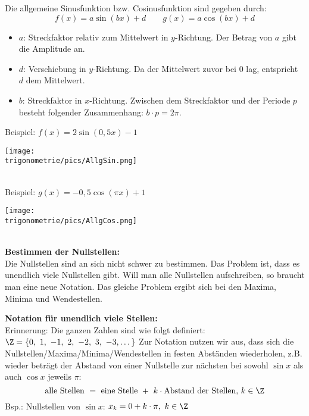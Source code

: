 Die allgemeine Sinusfunktion bzw. Cosinusfunktion sind gegeben durch:
\[f(x)=a\sin\left(bx\right)+d\qquad g(x)=a\cos\left(bx\right)+d\]
\begin{itemize}
	\item \(a\): \textcolor{loes}{Streckfaktor relativ zum Mittelwert in \(y\)-Richtung. Der Betrag von \(a\) gibt die Amplitude an.}\\
	\item \(d\): \textcolor{loes}{Verschiebung in \(y\)-Richtung. Da der Mittelwert zuvor bei \(0\) lag, entspricht \(d\) dem Mittelwert.}\\
	\item \(b\): \textcolor{loes}{Streckfaktor in \(x\)-Richtung. Zwischen dem Streckfaktor und der Periode \(p\) besteht folgender Zusammenhang: \(b\cdot p=2\pi\).}\\
\end{itemize}
Beispiel: \(\displaystyle f(x)=2\sin\left(0,5x\right)-1\)\\
\begin{minipage}{\textwidth}
	\texttt{[image: \\trigonometrie/pics/AllgSin.png]}\\
\end{minipage}\\
Beispiel: \(\displaystyle g(x)=-0,5\cos\left(\pi x\right)+1\)\\
\begin{minipage}{\textwidth}
	\texttt{[image: \\trigonometrie/pics/AllgCos.png]}\\
\end{minipage}\\
\newpage
\textbf{Bestimmen der Nullstellen:}\\
Die Nullstellen sind an sich nicht schwer zu bestimmen. Das Problem ist, dass es unendlich viele Nullstellen gibt. Will man alle Nullstellen aufschreiben, so braucht man eine neue Notation. Das gleiche Problem ergibt sich bei den Maxima, Minima und Wendestellen.
\begin{tcolorbox}
	\textbf{Notation für unendlich viele Stellen:}\\
	Erinnerung: Die ganzen Zahlen sind wie folgt definiert: \(\Z=\{0,\ 1,\ -1,\ 2,\ -2,\ 3,\ -3,\dots\}\)
	\textcolor{loestc}{Zur Notation nutzen wir aus, dass sich die Nullstellen/Maxima/Minima/Wendestellen in festen Abständen wiederholen, z.B. wieder beträgt der Abstand von einer Nullstelle zur nächsten bei sowohl \(\sin x\) als auch \(\cos x\)	jeweils \(\pi\):
		\[\text{alle Stellen }=\text{ eine Stelle }+\ k\cdot\text{Abstand der Stellen, }k\in\Z\]
		Bsp.: Nullstellen von \(\sin x\): \(x_k=0+k\cdot \pi,\ k\in\Z\)
	}
\end{tcolorbox}

